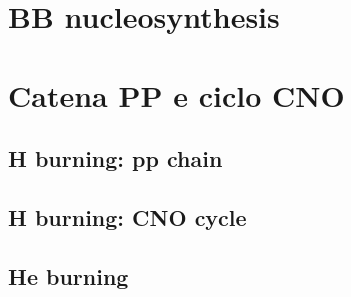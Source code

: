 \chapter{BB nucleosynthesis}
\PartialToc

\chapter{Catena PP e ciclo CNO}
\PartialToc

\section{H burning: pp chain}

\section{H burning: CNO cycle}

\section{He burning}
